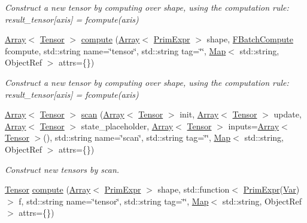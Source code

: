 \begin{DoxyCompactItemize}
\begin{DoxyCompactList}\small\item\em Construct a new tensor by computing over shape, using the computation rule\+: result\+\_\+tensor\mbox{[}axis\mbox{]} = fcompute(axis) \end{DoxyCompactList}\item 
\hyperlink{classtvm_1_1Array}{Array}$<$ \hyperlink{classtvm_1_1te_1_1Tensor}{Tensor} $>$ \hyperlink{namespacetvm_1_1te_aecda635ef665a59178b464d7ac6f55c8}{compute} (\hyperlink{classtvm_1_1Array}{Array}$<$ \hyperlink{classtvm_1_1PrimExpr}{Prim\+Expr} $>$ shape, \hyperlink{namespacetvm_1_1te_aabb227a4a0747faf17a2a8028f5430d5}{F\+Batch\+Compute} fcompute, std\+::string name=\char`\"{}tensor\char`\"{}, std\+::string tag=\char`\"{}\char`\"{}, \hyperlink{classtvm_1_1Map}{Map}$<$ std\+::string, Object\+Ref $>$ attrs=\{\})
\begin{DoxyCompactList}\small\item\em Construct a new tensor by computing over shape, using the computation rule\+: result\+\_\+tensor\mbox{[}axis\mbox{]} = fcompute(axis) \end{DoxyCompactList}\item 
\hyperlink{classtvm_1_1Array}{Array}$<$ \hyperlink{classtvm_1_1te_1_1Tensor}{Tensor} $>$ \hyperlink{namespacetvm_1_1te_ad78173237a27f7145c6b198be85b1f0d}{scan} (\hyperlink{classtvm_1_1Array}{Array}$<$ \hyperlink{classtvm_1_1te_1_1Tensor}{Tensor} $>$ init, \hyperlink{classtvm_1_1Array}{Array}$<$ \hyperlink{classtvm_1_1te_1_1Tensor}{Tensor} $>$ update, \hyperlink{classtvm_1_1Array}{Array}$<$ \hyperlink{classtvm_1_1te_1_1Tensor}{Tensor} $>$ state\+\_\+placeholder, \hyperlink{classtvm_1_1Array}{Array}$<$ \hyperlink{classtvm_1_1te_1_1Tensor}{Tensor} $>$ inputs=\hyperlink{classtvm_1_1Array}{Array}$<$ \hyperlink{classtvm_1_1te_1_1Tensor}{Tensor} $>$(), std\+::string name=\char`\"{}scan\char`\"{}, std\+::string tag=\char`\"{}\char`\"{}, \hyperlink{classtvm_1_1Map}{Map}$<$ std\+::string, Object\+Ref $>$ attrs=\{\})
\begin{DoxyCompactList}\small\item\em Construct new tensors by scan. \end{DoxyCompactList}\item 
\hyperlink{classtvm_1_1te_1_1Tensor}{Tensor} \hyperlink{namespacetvm_1_1te_aa7dcf52a4277350f202a9103e6ad9d17}{compute} (\hyperlink{classtvm_1_1Array}{Array}$<$ \hyperlink{classtvm_1_1PrimExpr}{Prim\+Expr} $>$ shape, std\+::function$<$ \hyperlink{classtvm_1_1PrimExpr}{Prim\+Expr}(\hyperlink{classtvm_1_1tir_1_1Var}{Var})$>$ f, std\+::string name=\char`\"{}tensor\char`\"{}, std\+::string tag=\char`\"{}\char`\"{}, \hyperlink{classtvm_1_1Map}{Map}$<$ std\+::string, Object\+Ref $>$ attrs=\{\})

\end{DoxyCompactItemize}
